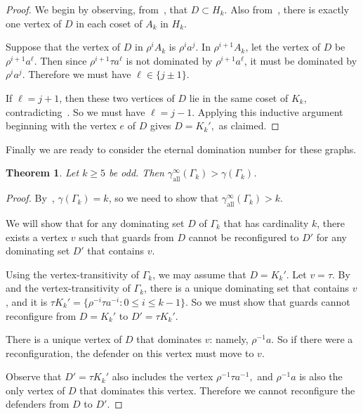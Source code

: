 \documentclass{amsart}
\newtheorem{thm}{Theorem}[section]
\theoremstyle{remark}
\theoremstyle{definition}
\newcommand{\etdom}{\gamma_{\mathrm{all}}^\infty}
\begin{document}
\begin{proof}
    We begin by observing, from~, that $D \subset H_k$. Also from~, there is exactly one vertex of $D$ in each coset of $A_k$ in $H_k$.

    Suppose that the vertex of $D$ in $\rho^i A_k$ is $\rho^i a^j$. In $\rho^{i+1}A_k$, let the vertex of $D$ be $\rho^{i+1} a^\ell$. Then since $\rho^{i+1}\tau a^\ell$ is not dominated by $\rho^{i+1} a^\ell$, it must be dominated by $\rho^i a^j$. Therefore we must have $\ell \in \{j\pm1\}$.

    If $\ell=j+1$, then these two vertices of $D$ lie in the same coset of $K_k$, contradicting~. So we must have $\ell=j-1$. Applying this inductive argument beginning with the vertex $e$ of $D$ gives $D=K_k',$ as claimed.
\end{proof}

Finally we are ready to consider the eternal domination number for these graphs.

\begin{thm}\label{etdom-bigger}
    Let $k\ge 5$ be odd. Then $\etdom(\Gamma_k) >\gamma(\Gamma_k)$.
\end{thm}

\begin{proof}
    By~, $\gamma(\Gamma_k)=k$, so we need to show that $\etdom(\Gamma_k)>k$.

    We will show that for any dominating set $D$ of $\Gamma_k$ that has cardinality $k$, there exists a vertex $v$ such that guards from $D$ cannot be reconfigured to $D'$ for any dominating set $D'$ that contains $v$.

    Using the vertex-transitivity of $\Gamma_k$, we may assume that $D=K_k'.$ Let $v=\tau$. By~ and the vertex-transitivity of $\Gamma_k$, there is a unique dominating set that contains $v$, and it is $\tau K_k'=\{\rho^{-i}\tau a^{-i}: 0 \le i \le k-1\}.$ So we must show that guards cannot reconfigure from $D=K_k'$ to $D'=\tau K_k'$.

    There is a unique vertex of $D$ that dominates $v$: namely, $\rho^{-1}a$. So if there were a reconfiguration, the defender on this vertex must move to $v$. 

    Observe that $D'=\tau K_k'$ also includes the vertex $\rho^{-1}\tau a^{-1},$ and $\rho^{-1}a$ is also the only vertex of $D$ that dominates this vertex. Therefore we cannot reconfigure the defenders from $D$ to $D'$.
\end{proof}
\end{document}
